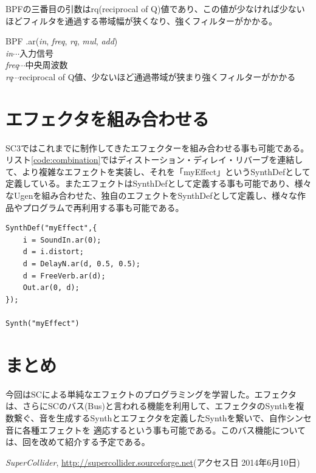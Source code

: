 \documentclass{jsarticle}
\begin{document}
BPFの三番目の引数はrq(reciprocal of Q)値であり、この値が少なければ少ないほどフィルタを通過する帯域幅が狭くなり、強くフィルターがかかる。

\begin{itembox}[l]{BPF}
{\footnotesize 
.ar({\it in}, {\it freq}, {\it rq}, {\it mul}, {\it add})\\

{\it in}$\cdots$入力信号\\
{\it freq}$\cdots$中央周波数\\
{\it rq}$\cdots$reciprocal of Q値、少ないほど通過帯域が狭まり強くフィルターがかかる\\
}
\end{itembox}

\section{エフェクタを組み合わせる}
SC3ではこれまでに制作してきたエフェクターを組み合わせる事も可能である。リスト\ref{code:combination}ではディストーション・ディレイ・リバーブを連結して、より複雑なエフェクトを実装し、それを「myEffect」というSynthDefとして定義している。またエフェクトはSynthDefとして定義する事も可能であり、様々なUgenを組み合わせた、独自のエフェクトをSynthDefとして定義し、様々な作品やプログラムで再利用する事も可能である。

\begin{lstlisting}[caption=エフェクトの組み合わせ, label=code:combination]
SynthDef("myEffect",{
	i = SoundIn.ar(0);
	d = i.distort;
	d = DelayN.ar(d, 0.5, 0.5);
	d = FreeVerb.ar(d);
	Out.ar(0, d);
});

Synth("myEffect")
\end{lstlisting}


\section{まとめ}
今回はSCによる単純なエフェクトのプログラミングを学習した。エフェクタは、さらにSCのバス(Bus)と言われる機能を利用して、エフェクタのSynthを複数繋ぐ、音を生成するSynthとエフェクタを定義したSynthを繋いで、自作シンセ音に各種エフェクトを
適応するという事も可能である。このバス機能については、回を改めて紹介する予定である。


\begin{thebibliography}{citations}
   {\it SuperCollider}, \url{http://supercollider.sourceforge.net}(アクセス日 2014年6月10日)
\end{thebibliography}
\end{document}

